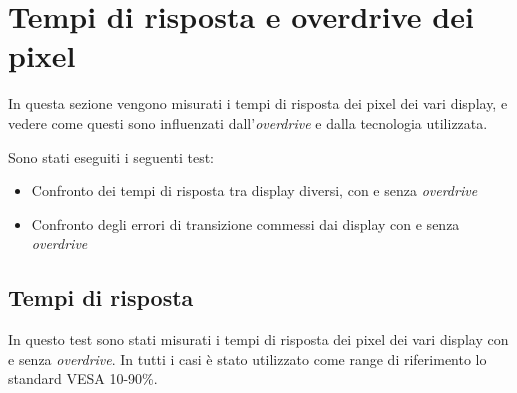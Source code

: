 \section{Tempi di risposta e overdrive dei pixel}
In questa sezione vengono misurati i tempi di risposta dei pixel dei vari display, e vedere come questi sono influenzati dall'\textit{overdrive} e dalla tecnologia utilizzata.

Sono stati eseguiti i seguenti test:\begin{itemize}
	\item Confronto dei tempi di risposta tra display diversi, con e senza \textit{overdrive}
	\item Confronto degli errori di transizione commessi dai display con e senza \textit{overdrive}
\end{itemize}

\subsection{Tempi di risposta}
In questo test sono stati misurati i tempi di risposta dei pixel dei vari display con e senza \textit{overdrive}. In tutti i casi è stato utilizzato come range di riferimento lo standard VESA 10-90\%.

